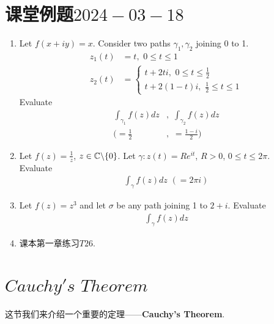 \section{课堂例题$2024-03-18$}
	\begin{enumerate}
		\item Let $f(x + iy) = x$. Consider two paths $\gamma_1 , \gamma_2$ joining 0 to 1.
		\begin{align}
			z_{1}(t) &= t , \,\, 0 \leq t \leq 1 \\
			z_{2}(t) &= 
			\begin{cases}
				t + 2t i , \,\, 0 \leq t \leq \frac{1}{2} \\
				t + 2(1 - t)i , \,\, \frac{1}{2} \leq t \leq 1
			\end{cases}
		\end{align}
		Evaluate
		\begin{align}
			\int_{\gamma_1}{f(z) dz} &, \,\, \int_{\gamma_2}{f(z) dz} \\
			 ( = \frac{1}{2} &, \,\, = \frac{1 - i}{2})
		\end{align}
		
		\vspace{2em}
		\item Let $f(z) = \frac{1}{z}$, $z \in \mathbb{C} \backslash \{ 0 \}$. Let $\gamma : z(t) = R e^{it}$, $R > 0$, $0 \leq t \leq 2\pi$.\\
		Evaluate
		\begin{align}
			\int_{\gamma}{f(z) dz} \,\, (= 2\pi i)
		\end{align}
	
		\vspace{2em}
		\item Let $f(z) = z^3$ and let $\sigma$ be any path joining 1 to $2 + i$. Evaluate
		\begin{align}
			\int_{\gamma}{f(z) dz}
		\end{align}
	
		\vspace{2em}
		\item 课本第一章练习$T26$.
	\end{enumerate}

\newpage
\section{$Cauchy's \,\, Theorem$}
	\begin{center}
		这节我们来介绍一个重要的定理——\textbf{Cauchy's Theorem}.
	\end{center}

